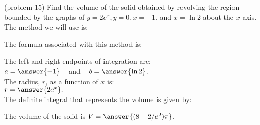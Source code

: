 \documentclass{ximera}
\begin{document}
\begin{problem}(problem 15)
Find the volume of the solid obtained by revolving the region bounded by the graphs of $y = 2e^x, y = 0, x = -1$, and $x = \ln 2$ about the $x$-axis.\\
The method we will use is:
\begin{multipleChoice}
\end{multipleChoice}

The formula associated with this method is:
\begin{multipleChoice}
\end{multipleChoice}

The left and right endpoints of integration are:\\
$a = \answer{-1}\;\;\;$ and $\;\;\; b = \answer{\ln 2}$.\\
The radius, $r$, as a function of $x$ is:\\
$r = \answer{2e^x}.$\\

The definite integral that represents the volume is given by:\\
\begin{multipleChoice}
\end{multipleChoice}

The volume of the solid is $V = \answer{(8-2/{e^2})\pi}$.

\end{problem}
\end{document}
